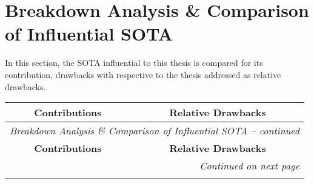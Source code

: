 \section{Breakdown Analysis \& Comparison of Influential \ac{SOTA}}

In this section, the \ac{SOTA} influential to this thesis is compared for its contribution, drawbacks with respective to the thesis addressed as relative drawbacks.



\begin{longtable}{|p{7cm}|p{7cm}|}
    \hline \multicolumn{1}{|c|}{\textbf{Contributions}}                                                                                                                      & \multicolumn{1}{c|}{\textbf{Relative Drawbacks}} \\ \hline
    \endfirsthead

    \multicolumn{2}{c}{\textit{Breakdown Analysis \& Comparison of Influential \ac{SOTA} -- continued}}                                                                                                                         \\
    \hline \multicolumn{1}{|c|}{\textbf{Contributions}}                                                                                                                      & \multicolumn{1}{c|}{\textbf{Relative Drawbacks}} \\ \hline
    \endhead

    \hline \multicolumn{2}{r}{\textit{Continued on next page}}                                                                                                                                                                  \\
    \endfoot


\end{longtable}
